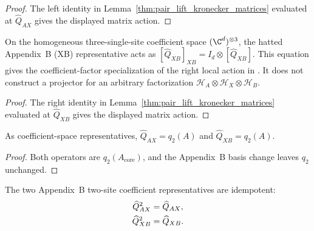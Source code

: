 \begin{proof}
    \leanok
    The left identity in
    Lemma~\ref{thm:pair_lift_kronecker_matrices} evaluated at
    $\widehat Q_{AX}$ gives the displayed matrix action.
\end{proof}

\begin{lemma}
    \label{thm:appendixB_qxb_factor_action}
    \leanok
    On the homogeneous three-single-site coefficient space
    $(\C^d)^{\otimes3}$, the hatted Appendix~B (XB) representative acts as
    $[\widehat Q_{XB}]_{XB} =I_d\otimes[\widehat Q_{XB}]$.
    This equation gives the coefficient-factor specialization of the right
    local action in \cite[Definition~D.2]{Cirac2016MPDO_arXiv}. It does not
    construct a projector for an arbitrary factorization
    $\mathcal H_A\otimes\mathcal H_X\otimes\mathcal H_B$.
\end{lemma}

\begin{proof}
    \leanok
    The right identity in
    Lemma~\ref{thm:pair_lift_kronecker_matrices} evaluated at
    $\widehat Q_{XB}$ gives the displayed matrix action.
\end{proof}

\begin{lemma}
    \label{lem:appendixB_qax_qxb_parent_interaction}
    \leanok
    As coefficient-space representatives,
    $\widehat Q_{AX}=q_2(A)$ and $\widehat Q_{XB}=q_2(A)$.
\end{lemma}

\begin{proof}
    \leanok
    Both operators are $q_2(A_{\mathrm{core}})$, and the Appendix~B basis
    change leaves $q_2$ unchanged.
\end{proof}

\begin{lemma}
    \label{lem:appendixB_qax_qxb_idempotent}
    \leanok
    The two Appendix~B two-site coefficient representatives are idempotent:
    \begin{align}
        \widehat Q_{AX}^{2}
         & =\widehat Q_{AX},
        \notag               \\
        \widehat Q_{XB}^{2}
         & =\widehat Q_{XB}.
        \notag
    \end{align}
\end{lemma}

